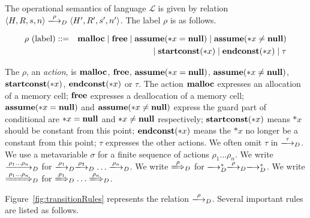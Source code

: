 The operational semantics of language \(\mathcal{L}\) is given by
relation \(\langle H, R, s, n \rangle \xlongrightarrow{\rho}_D
\langle H', R', s', n' \rangle\). The label \(\rho\) is as follows.

\begin{eqnarray*}
 \rho \mbox{ (label)} &::=& \mathbf{malloc} \mid \mathbf{free} \mid \mathbf{assume}(*x = \mathbf{null}) \mid \mathbf{assume}(*x \ne \mathbf{null})  \\
 &&\mid \mathbf{startconst}(*x) \mid \mathbf{endconst}(*x) \mid \tau  \\
\end{eqnarray*}

The \(\rho\), an \emph{action}, is \(\mathbf{malloc}\), \(\mathbf{free}\), \(\mathbf{assume}(*x = \mathbf{null})\),
\(\mathbf{assume}(*x \ne \mathbf{null})\), \(\mathbf{startconst}(*x)\), \(\mathbf{endconst}(*x) \) or \(\tau\).  The action
\(\mathbf{malloc}\) expresses an allocation of a memory cell; \(\mathbf{free}\)
expresses a deallocation of a memory cell; \(\mathbf{assume}(*x = \mathbf{null})\) and \(\mathbf{assume}(*x \ne \mathbf{null})\)
express the guard part of conditional are \( *x = \mathbf{null} \) and \(*x \ne \mathbf{null}\)
respectively; \(\mathbf{startconst}(*x)\) means \(*x\) should be constant from
this point; \(\mathbf{endconst}(*x)\) means the \(*x\) no longer be a constant
from this point; \(\tau\) expresses the other actions.  We often omit
\(\tau\) in \(\xlongrightarrow{\tau}_D\).  We use a metavariable
\(\sigma\) for a finite sequence of actions \(\rho_1\dots\rho_n\).  We
write \(\xlongrightarrow{\rho_1\dots\rho_n}_D\) for
\(\xlongrightarrow{\rho_1}_D\xlongrightarrow{\rho_2}_D\dots\xlongrightarrow{\rho_n}_D\).
We write \(\xLongrightarrow{\rho}_D\) for
\(\xlongrightarrow{}_D^*\xlongrightarrow{\rho}_D\xlongrightarrow{}_D^*\).
We write \(\xLongrightarrow{\rho_1\dots\rho_n}_D\) for
\(\xLongrightarrow{\rho_1}_D\dots\xLongrightarrow{\rho_n}_D\).

Figure~\ref{fig:transitionRules} represents the relation
\(\xlongrightarrow{\rho}_D\). Several important rules are listed as
follows.

